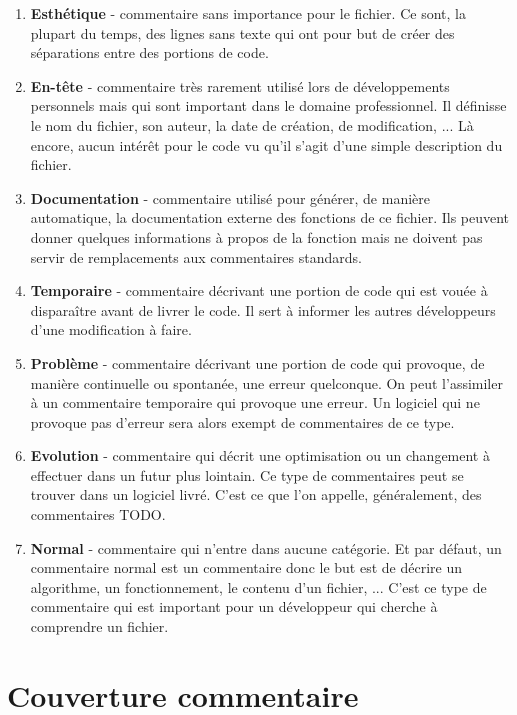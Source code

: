 \documentclass[10pt,a4paper,twoside, openany]{report}
\begin{document}
\begin{enumerate}
\item{\textbf{Esth\'etique} - commentaire sans importance pour le fichier. Ce sont, la plupart du temps, des lignes sans texte qui ont pour but de cr\'eer des s\'eparations entre des portions de code.\newline}
\item{\textbf{En-t\^ete} - commentaire tr\`es rarement utilis\'e lors de d\'eveloppements personnels mais qui sont important dans le domaine professionnel. Il d\'efinisse le nom du fichier, son auteur, la date de cr\'eation, de modification, ... L\`a encore, aucun int\'er\^et pour le code vu qu'il s'agit d'une simple description du fichier.\newline}
\item{\textbf{Documentation} - commentaire utilis\'e pour g\'en\'erer, de mani\`ere automatique, la documentation externe des fonctions de ce fichier. Ils peuvent donner quelques informations \`a propos de la fonction mais ne doivent pas servir de remplacements aux commentaires standards.\newline}
\item{\textbf{Temporaire} - commentaire d\'ecrivant une portion de code qui est vou\'ee \`a dispara\^itre avant de livrer le code. Il sert \`a informer les autres d\'eveloppeurs d'une modification \`a faire.\newline}
\item{\textbf{Probl\`eme} - commentaire d\'ecrivant une portion de code qui provoque, de mani\`ere continuelle ou spontan\'ee, une erreur quelconque. On peut l'assimiler \`a un commentaire temporaire qui provoque une erreur. Un logiciel qui ne provoque pas d'erreur sera alors exempt de commentaires de ce type.\newline}
\item{\textbf{Evolution} - commentaire qui d\'ecrit une optimisation ou un changement \`a effectuer dans un futur plus lointain. Ce type de commentaires peut se trouver dans un logiciel livr\'e. C'est ce que l'on appelle, g\'en\'eralement, des commentaires TODO.\newline}
\item{\textbf{Normal} - commentaire qui n'entre dans aucune cat\'egorie. Et par d\'efaut, un commentaire normal est un commentaire donc le but est de d\'ecrire un algorithme, un fonctionnement, le contenu d'un fichier, ... C'est ce type de commentaire qui est important pour un d\'eveloppeur qui cherche \`a comprendre un fichier.\newline}
\end{enumerate}

\section{Couverture commentaire}
\end{document}
